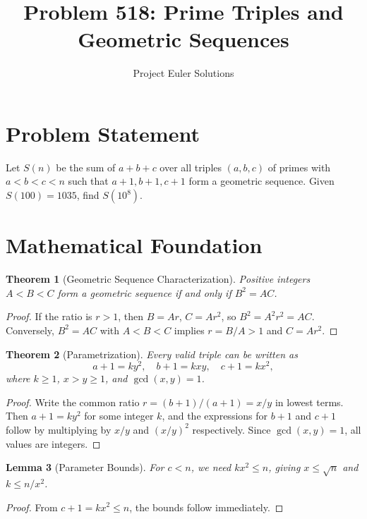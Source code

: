 \documentclass[11pt]{article}
\title{Problem 518: Prime Triples and Geometric Sequences}
\author{Project Euler Solutions}
\date{}
\newtheorem{theorem}{Theorem}
\newtheorem{lemma}[theorem]{Lemma}
\begin{document}
\maketitle

\section{Problem Statement}

Let $S(n)$ be the sum of $a + b + c$ over all triples $(a, b, c)$ of primes with $a < b < c < n$ such that $a+1, b+1, c+1$ form a geometric sequence. Given $S(100) = 1035$, find $S(10^8)$.

\section{Mathematical Foundation}

\begin{theorem}[Geometric Sequence Characterization]
Positive integers $A < B < C$ form a geometric sequence if and only if $B^2 = AC$.
\end{theorem}

\begin{proof}
If the ratio is $r > 1$, then $B = Ar$, $C = Ar^2$, so $B^2 = A^2r^2 = AC$. Conversely, $B^2 = AC$ with $A < B < C$ implies $r = B/A > 1$ and $C = Ar^2$.
\end{proof}

\begin{theorem}[Parametrization]
Every valid triple can be written as
\[
a+1 = ky^2, \quad b+1 = kxy, \quad c+1 = kx^2,
\]
where $k \geq 1$, $x > y \geq 1$, and $\gcd(x,y) = 1$.
\end{theorem}

\begin{proof}
Write the common ratio $r = (b+1)/(a+1) = x/y$ in lowest terms. Then $a+1 = ky^2$ for some integer $k$, and the expressions for $b+1$ and $c+1$ follow by multiplying by $x/y$ and $(x/y)^2$ respectively. Since $\gcd(x,y) = 1$, all values are integers.
\end{proof}

\begin{lemma}[Parameter Bounds]
For $c < n$, we need $kx^2 \leq n$, giving $x \leq \sqrt{n}$ and $k \leq n/x^2$.
\end{lemma}

\begin{proof}
From $c + 1 = kx^2 \leq n$, the bounds follow immediately.
\end{proof}
\end{document}
